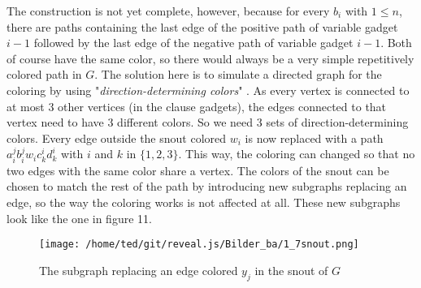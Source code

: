 \documentclass[12pt,a4paper]{article}
\begin{document}
\newline
The construction is not yet complete, however, because for every $b_i$ with $1 \leq n$, there are paths containing the last edge of the positive path of variable gadget $i-1$ followed by the last edge of the negative path of variable gadget $i-1$. Both of course have the same color, so there would always be a very simple repetitively colored path in $G$. The solution here is to simulate a directed graph for the coloring by using "\textit{direction-determining colors}" \citep[p. 6]{Manin2008}. As every vertex is connected to at most 3 other vertices (in the clause gadgets), the edges connected to that vertex need to have 3 different colors. So we need 3 sets of direction-determining colors. Every edge outside the snout colored $w_i$ is now replaced with a path $a^j_ib^j_iw_ic^i_kd^i_k$ with $i$ and $k$ in $\{ 1, 2, 3 \}$. This way, the coloring can changed so that no two edges with the same color share a vertex. The colors of the snout can be chosen to match the rest of the path by introducing new subgraphs replacing an edge, so the way the coloring works is not affected at all. These new subgraphs look like the one in figure 11.
\begin{figure}[h]
	\texttt{[image: /home/ted/git/reveal.js/Bilder\_ba/1\_7snout.png]}
	\caption{The subgraph replacing an edge colored $y_j$ in the snout of $G$}
\end{figure}
\newline
\end{document}
